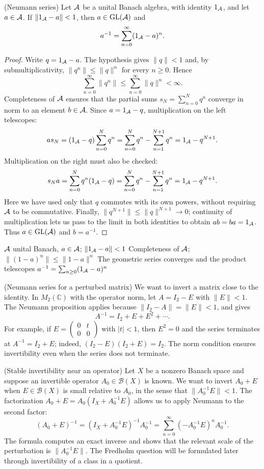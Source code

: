 \begin{cthproposicion}{(Neumann series)}
Let $\mathcal A$ be a unital Banach algebra, with identity $1_\mathcal A$, and let $a\in\mathcal A$.
If $\|1_\mathcal A-a\|<1$, then $a\in\operatorname{GL}(\mathcal A)$ and
\[
 a^{-1}=\sum_{n=0}^{\infty}(1_\mathcal A-a)^n.
\]
\end{cthproposicion}

\begin{proof}[Proof]
Write $q=1_\mathcal A-a$. The hypothesis gives $\|q\|<1$ and, by submultiplicativity,
$\|q^n\|\le\|q\|^n$ for every $n\ge0$. Hence
\[
 \sum_{n=0}^{\infty}\|q^n\|
 \le \sum_{n=0}^{\infty}\|q\|^n<\infty.
\]
Completeness of $\mathcal A$ ensures that the partial sums
$s_N=\sum_{n=0}^{N}q^n$ converge in norm to an element $b\in\mathcal A$.
Since $a=1_\mathcal A-q$, multiplication on the left telescopes:
\[
 as_N=(1_\mathcal A-q)\sum_{n=0}^{N}q^n
 =\sum_{n=0}^{N}q^n-\sum_{n=1}^{N+1}q^n
 =1_\mathcal A-q^{N+1}.
\]
Multiplication on the right must also be checked:
\[
 s_Na=\sum_{n=0}^{N}q^n(1_\mathcal A-q)
 =\sum_{n=0}^{N}q^n-\sum_{n=1}^{N+1}q^n
 =1_\mathcal A-q^{N+1}.
\]
Here we have used only that $q$ commutes with its own powers, without requiring
$\mathcal A$ to be commutative. Finally,
$\|q^{N+1}\|\le\|q\|^{N+1}\to0$; continuity of
multiplication lets us pass to the limit in both identities to obtain
$ab=ba=1_\mathcal A$. Thus $a\in\operatorname{GL}(\mathcal A)$ and $b=a^{-1}$.
\end{proof}

\proofdiagram
{$\mathcal A$ unital Banach, $a\in\mathcal A$; $\|1_\mathcal A-a\|<1$}
{Completeness of $\mathcal A$; $\|(1-a)^n\|\le\|1-a\|^n$}
{The geometric series converges and the product telescopes}
{$a^{-1}=\sum_{n\ge0}(1_\mathcal A-a)^n$}

\begin{cthejemplo}{(Neumann series for a perturbed matrix)}
We want to invert a matrix close to the identity. In
$M_2(\mathbb C)$ with the operator norm, let $A=I_2-E$ with
$\|E\|<1$. The Neumann proposition applies because
$\|I_2-A\|=\|E\|<1$, and gives
\[
 A^{-1}=I_2+E+E^2+\cdots.
\]
For example, if
$E=\begin{pmatrix}0&t\\0&0\end{pmatrix}$ with $|t|<1$,
then $E^2=0$ and the series terminates at
$A^{-1}=I_2+E$; indeed, $(I_2-E)(I_2+E)=I_2$.
The norm condition ensures invertibility even when the series does not terminate.
\end{cthejemplo}

\begin{cthejemplo}{(Stable invertibility near an operator)}
Let $X$ be a nonzero Banach space and suppose an invertible operator
$A_0\in\mathcal B(X)$ is known. We want to invert $A_0+E$ when
$E\in\mathcal B(X)$ is small relative to $A_0$, in the sense that
$\|A_0^{-1}E\|<1$. The factorization
$A_0+E=A_0(I_X+A_0^{-1}E)$ allows us to apply Neumann to the second factor:
\[
 (A_0+E)^{-1}=(I_X+A_0^{-1}E)^{-1}A_0^{-1}
 =\sum_{n=0}^{\infty}(-A_0^{-1}E)^n A_0^{-1}.
\]
The formula computes an exact inverse and shows that the relevant scale of
the perturbation is $\|A_0^{-1}E\|$. The Fredholm question will be formulated
later through invertibility of a class in a quotient.
\end{cthejemplo}

